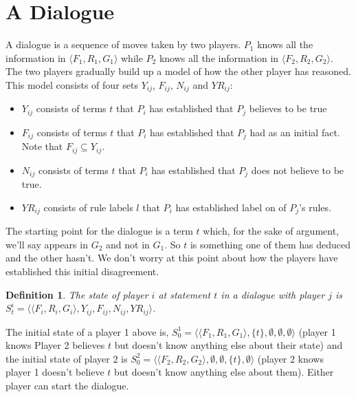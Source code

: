 \documentclass{blue-book}
\newtheorem{definition}{Definition}
\begin{document}
\section{A Dialogue}

A dialogue is a sequence of moves taken by two players.  $P_1$ knows all the information in $\langle F_1, R_1, G_1\rangle$ while $P_2$ knows all the information in $\langle F_2, R_2, G_2\rangle$.  The two players gradually build up a model of how the other player has reasoned.  This model consists of four sets $Y_{ij}$, $F_{ij}$, $N_{ij}$ and $YR_{ij}$:
\begin{itemize}
\item $Y_{ij}$ consists of terms $t$ that $P_i$ has established that $P_j$ believes to be true
\item $F_{ij}$ consists of terms $t$ that $P_i$ has established that $P_j$ had as an initial fact.  Note that $F_{ij} 
\subseteq Y_{ij}$.
\item$N_{ij}$ consists of terms $t$ that $P_i$ has established that $P_j$ does not believe to be true.
\item $YR_{ij}$ consists of rule labels $l$ that $P_i$ has established label on of $P_j$'s rules. 
\end{itemize}


The starting point for the dialogue is a term $t$ which, for the sake of argument, we'll say appears in $G_2$ and not in $G_1$.  So $t$ is something one of them has deduced and the other hasn't.  We don't worry at this point about how the players have established this initial disagreement.

\begin{definition}
The state of player $i$ at statement $t$ in a dialogue with player $j$ is $S^i_t = \langle \langle F_i, R_i, G_i \rangle, Y_{ij}, F_{ij}, N_{ij}, YR_{ij} \rangle$.  
\end{definition}

The initial state of a player 1 above is, $S^1_0 = \langle \langle F_1, R_1, G_1 \rangle, \{t\}, \emptyset, \emptyset, \emptyset \rangle$ (player 1 knows Player 2 believes $t$ but doesn't know anything else about their state) and the initial state of player 2 is $S^2_0 = \langle \langle F_2, R_2, G_2 \rangle, \emptyset, \emptyset, \{t\}, \emptyset \rangle$ (player 2 knows player 1 doesn't believe $t$ but doesn't know anything else about them).  Either player can start the dialogue.
\end{document}
